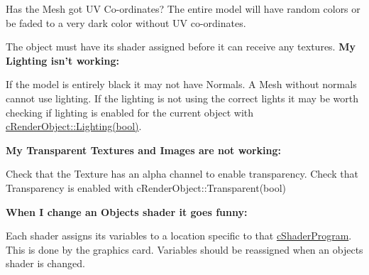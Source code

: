  Has the Mesh got UV Co-\/ordinates? The entire model will have random colors or be faded to a very dark color without UV co-\/ordinates. \par
 The object must have its shader assigned before it can receive any textures. {\bfseries  My Lighting isn't working: } \par
 If the model is entirely black it may not have Normals. A Mesh without normals cannot use lighting. If the lighting is not using the correct lights it may be worth checking if lighting is enabled for the current object with \hyperlink{classc_render_object_a67191d0fe8aceaa10052a542b3c34650}{cRenderObject::Lighting(bool)}. \par
 {\bfseries  My Transparent Textures and Images are not working:} \par
 Check that the Texture has an alpha channel to enable transparency. Check that Transparency is enabled with cRenderObject::Transparent(bool) \par
 {\bfseries When I change an Objects shader it goes funny:} \par
 Each shader assigns its variables to a location specific to that \hyperlink{classc_shader_program}{cShaderProgram}. This is done by the graphics card. Variables should be reassigned when an objects shader is changed. 